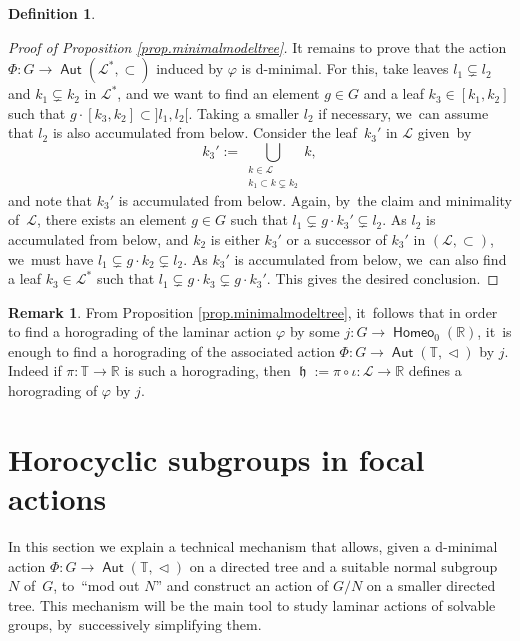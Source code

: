 \documentclass[JEP,XML,SOM,Unicode,NoFloatCountersInSection,published]{cedram}
\theoremstyle{definition}
\newtheorem{dfn}[thm]{Definition}
\newtheorem{rem}[thm]{Remark}
\DeclareMathOperator{\Aut}{\mathsf{Aut}}
\DeclareMathOperator{\homeo}{\mathsf{Homeo}}
\DeclareMathOperator{\hor}{\mathfrak{h}}
\newcommand{\R}{\mathbb{R}}
\newcommand{\Tbb}{\mathbb T}
\newcommand{\Lcal}{\mathcal{L}}
\newcommand{\treeorder}{\mathrel{\triangleleft}}
\begin{document}
\begin{dfn}
\begin{proof}[Proof of Proposition \ref{prop.minimalmodeltree}]
It remains to prove that the action $\Phi\colon G\to \Aut(\Lcal^*,\subset)$ induced by $\varphi$ is d-minimal. For this, take leaves $l_1\subsetneq l_2$ and $k_1\subsetneq k_2$ in $\Lcal^\ast$, and we want to find an element $g\in G$ and a leaf $k_3\in [k_1,k_2]$ such that $g\cdot [k_3,k_2]\subset ]l_1,l_2[$. Taking a smaller $l_2$ if necessary, we~can assume that $l_2$ is also accumulated from below. Consider the leaf~$k_3'$ in $\Lcal$ given~by\vspace*{-5pt}\enlargethispage{.5\baselineskip}
\[{k}_3':=\bigcup_{\substack{k\in\Lcal\\k_1\subset k\subsetneq k_2}}k,
\]
and note that $ k_3'$ is accumulated from below. Again, by~the claim and minimality of~$\Lcal$, there exists an element $g\in G$ such that
$l_1\subsetneq g\cdot  k_3' \subsetneq l_2$. As $l_2$ is accumulated from below, and $k_2$ is either $k_3'$ or a successor of $k_3'$ in $(\Lcal, \subset)$, we~must have $l_1\subsetneq g\cdot k_2 \subsetneq l_2$. As $k_3'$ is accumulated from below, we~can also find a leaf $k_3\in \Lcal^*$ such that $l_1\subsetneq g\cdot k_3\subsetneq g\cdot  k_3'$. This gives the desired conclusion.
\end{proof}

\begin{rem}\label{r-tree-horograding}
From Proposition \ref{prop.minimalmodeltree}, it~follows that in order to find a horograding of the laminar action $\varphi$ by some $j\colon G\to \homeo_0(\R)$, it~is enough to find a horograding of the associated action $\Phi \colon G\to \Aut(\Tbb, \treeorder)$ by $j$. Indeed if $\pi\colon \Tbb\to \R$ is such a horograding, then $\hor:=\pi\circ \iota\colon \Lcal\to \R$ defines a horograding of $\varphi$ by $j$.
\end{rem}

\section{Horocyclic subgroups in focal actions}
\label{sec horocyclic}

In this section we explain a technical mechanism that allows, given a d-minimal action $\Phi \colon G\to \Aut(\Tbb, \treeorder)$ on a directed tree and a suitable normal subgroup~$N$ of~$G$, to~``mod out $N$'' and construct an action of $G/N$ on a smaller directed tree. This mechanism will be the main tool to study laminar actions of solvable groups, by~successively simplifying them.



\end{dfn}
\end{document}
